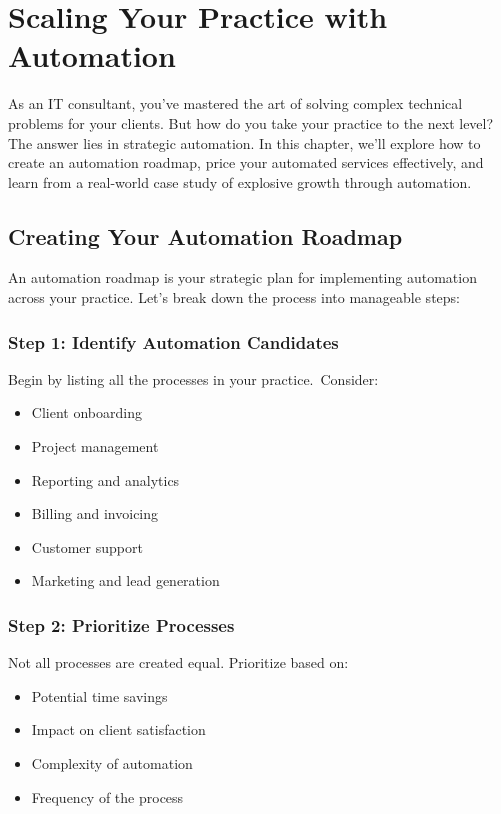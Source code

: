\chapter{Scaling Your Practice with Automation}



As an IT consultant, you've mastered the art of solving complex technical problems for your clients. But how do you take your practice to the next level? The answer lies in strategic automation. In this chapter, we'll explore how to create an automation roadmap, price your automated services effectively, and learn from a real-world case study of explosive growth through automation.

\section{Creating Your Automation Roadmap}

An automation roadmap is your strategic plan for implementing automation across your practice. Let's break down the process into manageable steps:

\subsection{Step 1: Identify Automation Candidates}

Begin by listing all the processes in your practice.\ Consider:
\begin{itemize}
    \item Client onboarding
    \item Project management
    \item Reporting and analytics
    \item Billing and invoicing
    \item Customer support
    \item Marketing and lead generation
\end{itemize}


\subsection{Step 2: Prioritize Processes}

Not all processes are created equal. Prioritize based on:
\begin{itemize}
    \item Potential time savings
    \item Impact on client satisfaction
    \item Complexity of automation
    \item Frequency of the process
\end{itemize}

